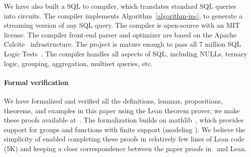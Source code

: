 We have also built a SQL to \dbsp compiler, which translates standard SQL queries
into \dbsp circuits.  The compiler implements Algorithm~\ref{algorithm-inc}, to
generate a streaming version of any SQL query.
The compiler is  open-source
with an MIT license.  The compiler front-end parser and optimizer
are based on the Apache Calcite~\cite{begoli-icmd18} infrastructure.  The
project is mature enough to pass all 7 million SQL Logic Tests~\cite{sqllogictest}.  The compiler handles
all aspects of SQL, including NULLs, ternary logic, grouping, aggregation, multiset queries, etc.

\paragraph{Formal verification}

We have formalized and verified all the definitions, lemmas,
propositions, theorems, and examples in this paper using the Lean theorem prover; we make
these proofs available at~.
The formalization builds on mathlib~\cite{mathlib2020}, which provides
support for groups and functions with finite support (modeling
\zrs). We believe the simplicity of \dbsp enabled completing these
proofs in relatively few lines of Lean code (5K) and keeping a close
correspondence between the paper proofs in~\cite{tr} and Lean.
